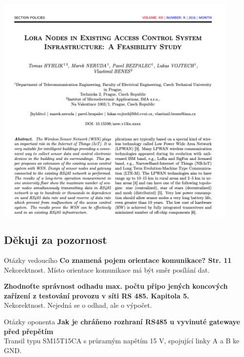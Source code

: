 \documentclass{beamer}
\begin{document}
\begin{frame}
	\centering
\includegraphics[width=0.9\textwidth]{Screenshot_odbornyClanek_1}
\end{frame}


\begin{frame}{}
	\section{Děkuji za pozornost}
\end{frame}


\begin{frame}{Otázky vedoucího}
		\textbf{Co znamená pojem orientace komunikace? Str. 11}
		\\
		\hspace{10pt}
		Nekorektnost. Místo orientace komunikace má být směr posílání dat.
		\vspace{15pt}		

		\textbf{Zhodnoťte správnost odhadu max. počtu připo
		jených koncových zařízení z testování provozu v síti RS 485. Kapitola 5.}
		\\
		\hspace{10pt}
		Nekorektnost. Nejedná se o odhad, ale o výpočet.
		\vspace{15pt}		

\end{frame}

\begin{frame}{Otázky oponenta}
		\textbf{Jak je chráňeno rozhraní RS485 u vyvinuté gatewaye před přepětím}
		\\
		\hspace{10pt}
		Transil typu SM15T15CA s průrazným napětím 15 V, spojující linky A a B ke GND.
		
\end{frame}
\end{document}
